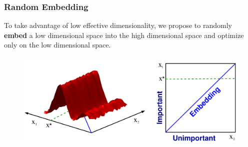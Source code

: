 \documentclass[grey]{beamer}
\begin{document}
 \begin{frame}
  \frametitle{Random Embedding}
  To take advantage of low effective dimensionality, we propose to 
  randomly {\bf \textcolor{myColor}{embed}} 
  a low dimensional space into the high dimensional space and optimize
  only on the low dimensional space.
  \begin{figure}[t]
   \includegraphics[width = 0.9\columnwidth]
   {../paper/figures/2to1embedding}
   \label{fig:ESSL_BLR}
  \end{figure}
 \end{frame}
 \begin{frame}
  
 \end{frame}
\end{document}

